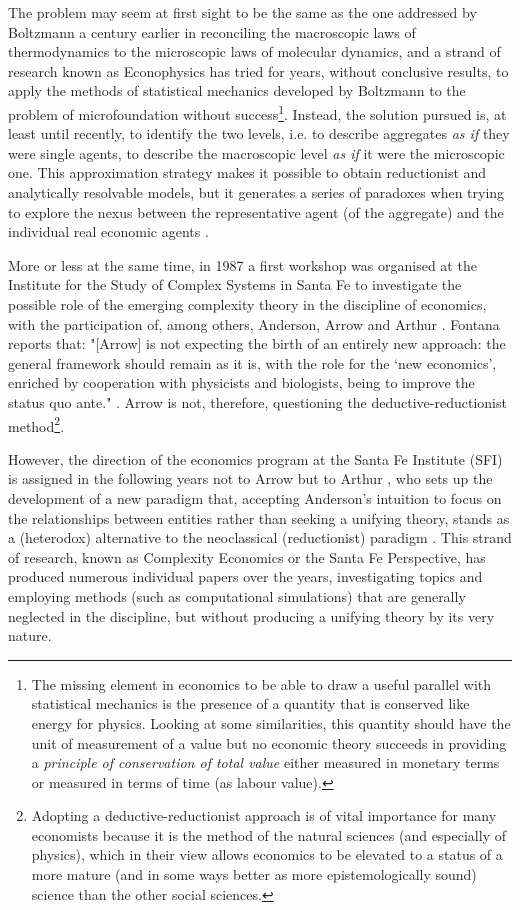 The problem may seem at first sight to be the same as the one addressed by Boltzmann a century earlier in reconciling the macroscopic laws of thermodynamics to the microscopic laws of molecular dynamics, and a strand of research known as Econophysics has tried for years, without conclusive results, to apply the methods of statistical mechanics developed by Boltzmann to the problem of microfoundation without success\footnote{The missing element in economics to be able to draw a useful parallel with statistical mechanics is the presence of a quantity that is conserved like energy for physics. Looking at some similarities, this quantity should have the unit of measurement of a value but no economic theory succeeds in providing a \textit{principle of conservation of total value} either measured in monetary terms or measured in terms of time (as labour value).}.
Instead, the solution pursued is, at least until recently, to identify the two levels, i.e. to describe aggregates \textit{as if} they were single agents, to describe the macroscopic level \textit{as if} it were the microscopic one. This approximation strategy makes it possible to obtain reductionist and analytically resolvable models, but it generates a series of paradoxes when trying to explore the nexus between the representative agent (of the aggregate) and the individual real economic agents \parencite{kirman1992}.

More or less at the same time, in 1987 a first workshop was organised at the Institute for the Study of Complex Systems in Santa Fe to investigate the possible role of the emerging complexity theory in the discipline of economics, with the participation of, among others, Anderson, Arrow and Arthur \parencite{fontana2010a}.
Fontana reports that: "[Arrow] is not expecting the birth of an entirely new approach: the general framework should remain as it is, with the role for the `new economics', enriched by cooperation with physicists and biologists, being to improve the status quo ante." \parencite{fontana2010a}. Arrow is not, therefore, questioning the deductive-reductionist method\footnote{Adopting a deductive-reductionist approach is of vital importance for many economists because it is the method of the natural sciences (and especially of physics), which in their view allows economics to be elevated to a status of a more mature (and in some ways better as more epistemologically sound) science than the other social sciences.}.

However, the direction of the economics program at the Santa Fe Institute (SFI) is assigned in the following years not to Arrow but to Arthur \parencite{fontana2010a}, who sets up the development of a new paradigm that, accepting Anderson's intuition to focus on the relationships between entities rather than seeking a unifying theory, stands as a (heterodox) alternative to the neoclassical (reductionist) paradigm \parencite{fontana2010,arthur2021}.
This strand of research, known as Complexity Economics or the Santa Fe Perspective, has produced numerous individual papers over the years, investigating topics and employing methods (such as computational simulations) that are generally neglected in the discipline, but without producing a unifying theory by its very nature.

